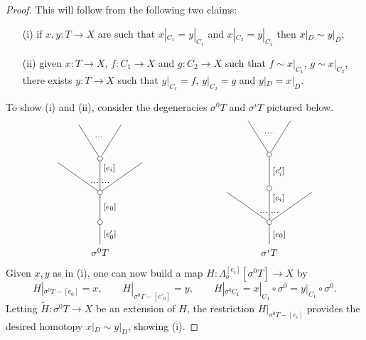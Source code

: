 \documentclass[a4paper,10pt
,draft
]{article}%
\numberwithin{equation}{section}
\numberwithin{figure}{section}
\theoremstyle{definition} %
\newcommand{\1}{\ensuremath{\mathbbm 1}}%
\begin{document}
\begin{proof}
This will follow from the following two claims:
\begin{itemize}
\item[(i)] if $x,y \colon T \to X$ are such that
$x|_{C_1} = y|_{C_1}$ and
$x|_{C_2} = y|_{C_2}$
then $x|_{D} \sim y|_{D}$;
\item[(ii)]
given $x \colon T \to X$, $f\colon C_1 \to X$ and
$g \colon C_2 \to X$ such that
$f \sim x|_{C_1}$, $g \sim x|_{C_2}$,
there exists
$y \colon T \to X$ such that
$y|_{C_1} = f$, $y|_{C_2} = g$ and
$y|_D = x|_D$.
\end{itemize}
To show (i) and (ii), consider the degeneracies
$\sigma^0 T$ and $\sigma^i T$ pictured below.
\[
\begin{tikzpicture}
[grow=up,auto,level distance=3em,
every node/.style = {font=\footnotesize},
dummy/.style={circle,draw,inner sep=0pt,minimum size=1.75mm}]
	\node at (0,0) [font=\normalsize]{$\sigma^0 T$}
		child{node [dummy] {}
		child{node [dummy] {}
			child{
			edge from parent node [swap,near end] {} node [near start,inner sep=1pt,name=Kn] {}}
			child[level distance=3.4em]{node [dummy] {}
				child{
				edge from parent node [swap,near end] {} node [name=Kn2] {}}
				child{
				edge from parent node [near end] {}
node [name=Kone2,swap] {}}
			edge from parent node [near end,swap] {$[e_i]$}
node [near start,inner sep=1pt,name=Kone,swap] {}
node [near start,inner sep=1pt,name=Kone1] {}}
			child{
			edge from parent node [near end] {}
node [swap] {}
node [near start,inner sep=1pt,name=Kn1,swap]{}}
		edge from parent node [swap] {$[e_0]$}}
		edge from parent node [swap] {$[e'_0]$}
		};
		\draw [dotted,thick] (Kone) -- (Kn) ;
		\draw [dotted,thick] (Kone1) -- (Kn1) ;
		\draw [dotted,thick] (Kone2) -- (Kn2) ;
	\node at (6,0) [font=\normalsize]{$\sigma^i T$}
		child{node [dummy] {}
			child{
			edge from parent node [swap,near end] {} node [near start,inner sep=1pt,name=Kn] {}}
			child[level distance=3.4em]{node [dummy] {}
			child{node [dummy] {}
				child{
				edge from parent node [swap,near end] {} node [name=Kn2] {}}
				child{
				edge from parent node [near end] {}
node [name=Kone2,swap] {}}
			edge from parent node [swap] {$[e'_i]$}}
			edge from parent node [near end,swap] {$[e_i]$}
node [near start,inner sep=1pt,name=Kone,swap] {}
node [near start,inner sep=1pt,name=Kone1] {}}
			child{
			edge from parent node [near end] {}
node [swap] {}
node [near start,inner sep=1pt,name=Kn1,swap]{}}
		edge from parent node [swap] {$[e_0]$}
		};
		\draw [dotted,thick] (Kone) -- (Kn) ;
		\draw [dotted,thick] (Kone1) -- (Kn1) ;
		\draw [dotted,thick] (Kone2) -- (Kn2) ;
\end{tikzpicture}
\]
Given $x,y$ as in (i), one can now build a map
$H \colon \Lambda_o^{[e_i]}[\sigma^0 T] \to X$ by
\[
	H|_{\sigma^0 T - [e_0]} = x,
\qquad
	H|_{\sigma^0 T - [e'_0]} = y,
\qquad
	H|_{\sigma^0 C_1} = 
	x|_{C_1} \circ \sigma^0 = 
	y|_{C_1} \circ \sigma^0.
\]
Letting $\widetilde{H}\colon \sigma^0 T \to X$
be an extension of $H$,
the restriction $H|_{\sigma^0 T - [e_i]}$
provides the desired homotopy 
$x|_{D} \sim y|_{D}$, showing (i).



\end{proof}
\end{document}
